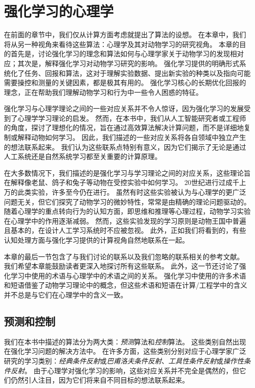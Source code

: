 

\chapter{强化学习的心理学} \label{chap:chap11}

在前面的章节中，我们仅从计算方面考虑就提出了算法的设想。
在本章中，我们将从另一种视角来看待这些算法：心理学及其对动物学习的研究视角。
本章的目的首先是，讨论强化学习的理念和算法如何与心理学家关于动物学习的发现相对应；其次是，解释强化学习对动物学习研究的影响。
强化学习提供的明确形式系统化了任务、回报和算法，这对于理解实验数据、提出新实验的种类以及指向可能需要操控和测量的关键因素，都是极其有用的。
强化学习核心的长期优化回报的理念，正在帮助我们理解动物学习和行为中一些令人困惑的特征。


强化学习与心理学理论之间的一些对应关系并不令人惊讶，因为强化学习的发展受到了心理学学习理论的启发。
然而，在本书中，我们从人工智能研究者或工程师的角度，探讨了理想化的情况，旨在通过高效算法解决计算问题，而不是详细地复制或解释动物如何学习。
因此，我们描述的一些对应关系将各自领域中独立产生的想法联系起来。
我们认为这些联系点特别有意义，因为它们揭示了无论是通过人工系统还是自然系统学习都至关重要的计算原理。


在大多数情况下，我们描述的是强化学习与学习理论之间的对应关系，这些理论旨在解释像老鼠、鸽子和兔子等动物在受控实验中如何学习。
20世纪进行过成千上万的此类实验，许多至今仍在进行。
虽然有时这些实验被认为与心理学的更广泛问题无关，但它们探究了动物学习的微妙特性，常常是由精确的理论问题驱动的。
随着心理学的重点转向行为的认知方面，即思维和推理等心理过程，动物学习实验在心理学中的作用逐渐减弱。
然而，这些实验发现的学习原则是动物王国中普遍且基本的，在设计人工学习系统时不应被忽视。
此外，正如我们将看到的，有些认知处理方面与强化学习提供的计算视角自然地联系在一起。


本章的最后一节包含了与我们讨论的联系以及我们忽略的联系相关的参考文献。
我们希望本章能鼓励读者更深入地探讨所有这些联系。
此外，这一节还讨论了强化学习中使用的术语与心理学中的术语之间的关系。
强化学习中使用的许多术语和短语借鉴了动物学习理论中的概念，但这些术语和短语在计算/工程学中的含义并不总是与它们在心理学中的含义一致。


\section{预测和控制}


我们在本书中描述的算法分为两大类：\textit{预测}算法和\textit{控制}算法。
这些类别自然出现在强化学习问题的解决方法中。
在许多方面，这些类别分别对应于心理学家广泛研究的学习类别：\textit{经典条件反射}或\textit{巴甫洛夫条件反射}、\textit{工具性条件反射}或\textit{操作性条件反射}。
由于心理学对强化学习的影响，这些对应关系并不完全是偶然的，但它们仍然引人注目，因为它们将来自不同目标的想法联系起来。


